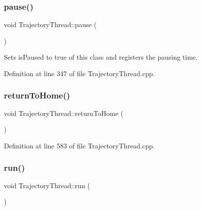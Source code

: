 \subsubsection{\texorpdfstring{pause()}{pause()}}
{\footnotesize\ttfamily void Trajectory\+Thread\+::pause (\begin{DoxyParamCaption}{ }\end{DoxyParamCaption})}

Sets is\+Paused to true of this class and registers the pausing time. 

Definition at line 347 of file Trajectory\+Thread.\+cpp.

\hypertarget{classocra__recipes_1_1TrajectoryThread_ac1335eaa6c85597cab894673ef9a56f9}{}\label{classocra__recipes_1_1TrajectoryThread_ac1335eaa6c85597cab894673ef9a56f9} 
\subsubsection{\texorpdfstring{return\+To\+Home()}{returnToHome()}}
{\footnotesize\ttfamily void Trajectory\+Thread\+::return\+To\+Home (\begin{DoxyParamCaption}{ }\end{DoxyParamCaption})}



Definition at line 583 of file Trajectory\+Thread.\+cpp.

\hypertarget{classocra__recipes_1_1TrajectoryThread_a835a13515f49bfa8ff047dbbaa6deb14}{}\label{classocra__recipes_1_1TrajectoryThread_a835a13515f49bfa8ff047dbbaa6deb14} 
\subsubsection{\texorpdfstring{run()}{run()}}
{\footnotesize\ttfamily void Trajectory\+Thread\+::run (\begin{DoxyParamCaption}{ }\end{DoxyParamCaption})\hspace{0.3cm}{\ttfamily [virtual]}}

